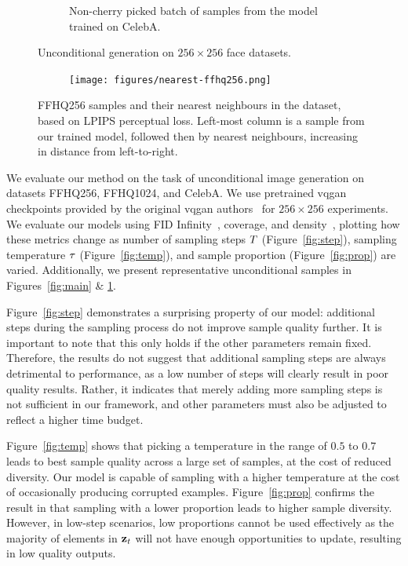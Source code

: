 \begin{figure}
\begin{subfigure}[b]{0.47\textwidth}
        \caption{
            Non-cherry picked batch of samples from the model trained on CelebA.
        }
    \end{subfigure}
    \caption{Unconditional generation on $256 \times 256$ face datasets.}
    \label{fig:face}
\end{figure}

\begin{figure}[ht]
    \centering
    \begin{subfigure}[b]{\textwidth}
        \centering
        \texttt{[image: figures/nearest-ffhq256.png]}
    \end{subfigure}
    \caption{
        FFHQ256 samples and their nearest neighbours in the dataset, based on LPIPS
        perceptual loss. Left-most column is a sample from our trained
        model, followed then by nearest neighbours, increasing in distance
        from left-to-right.
    }
\end{figure}

We evaluate our method on the task of unconditional image generation on datasets
FFHQ256, FFHQ1024, and CelebA. We use pretrained \gls{vqgan} checkpoints
provided by the original \gls{vqgan} authors~\cite{esser2021taming} for $256
\times 256$ experiments. We evaluate our models using FID
Infinity~\cite{chong2020effectively}, coverage, and
density~\cite{ferjad2020icml}, plotting how these metrics change as number of
sampling steps $T$ (Figure~\ref{fig:step}), sampling temperature
$\tau$ (Figure~\ref{fig:temp}), and sample proportion
(Figure~\ref{fig:prop}) are varied. Additionally, we present representative
unconditional samples in Figures~\ref{fig:main} \& \ref{fig:face}.

Figure~\ref{fig:step} demonstrates a surprising property of our model:
additional steps during the sampling process do not improve sample quality
further. It is important to note that this only holds if the other parameters
remain fixed. Therefore, the results do not suggest that additional sampling
steps are always detrimental to performance, as a low number of steps will
clearly result in poor quality results. Rather, it indicates that merely
adding more sampling steps is not sufficient in our framework, and other
parameters must also be adjusted to reflect a higher time budget.

Figure~\ref{fig:temp} shows that picking a temperature in the range of $0.5$ to
$0.7$ leads to best sample quality across a large set of samples, at the cost of
reduced diversity. Our model is capable of sampling with a higher temperature at
the cost of occasionally producing corrupted examples. Figure~\ref{fig:prop}
confirms the result in \citet{savinov2022stepunrolled} that sampling with a
lower proportion leads to higher sample diversity. However, in low-step
scenarios, low proportions cannot be used effectively as the majority of
elements in $\mathbf{z}_t$ will not have enough opportunities to update, resulting
in low quality outputs.

